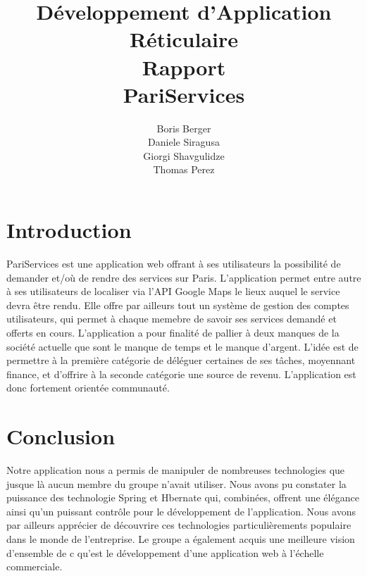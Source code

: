 \documentclass[a4paper,11pt]{article}
\author{Boris Berger\\Daniele Siragusa\\Giorgi Shavgulidze\\Thomas Perez}
\title{Développement d'Application Réticulaire\\Rapport\\PariServices}
\begin{document}
\maketitle
\newpage

\tableofcontents
\newpage

\section{Introduction}
PariServices est une application web offrant à ses utilisateurs la possibilité de demander et/où de rendre des services sur Paris. L'application permet entre autre à ses utilisateurs de localiser via l'API Google Maps le lieux auquel le service devra être rendu. Elle offre par ailleurs tout un système de gestion des comptes utilisateurs, qui permet à chaque memebre de savoir ses services demandé et offerts en cours.
\newline
L'application a pour finalité de pallier à deux manques de la société actuelle que sont le manque de temps et le manque d'argent. L'idée est de permettre à la première catégorie de déléguer certaines de ses tâches, moyennant finance, et d'offrire à la seconde catégorie une source de revenu. L'application est donc fortement orientée communauté.









\section{Conclusion}
Notre application nous a permis de manipuler de nombreuses technologies que jusque là aucun membre du groupe n'avait utiliser. Nous avons pu constater la puissance des technologie Spring et Hbernate qui, combinées, offrent une élégance ainsi qu'un puissant contrôle pour le développement de l'application. Nous avons par ailleurs apprécier de découvrire ces technologies particulièrements populaire dans le monde de l'entreprise. Le groupe a également acquis une meilleure vision d'ensemble de c qu'est le développement d'une application web à l'échelle commerciale.
\end{document}
